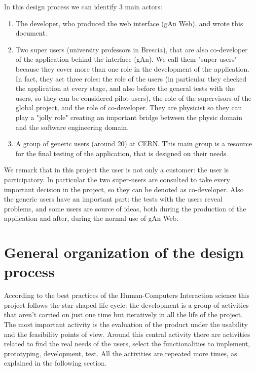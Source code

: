 In this design process we can identify 3 main actors: 
\begin{enumerate}

\item
The developer, who produced the web interface (gAn Web), and wrote this document.

\item 
Two super users (university professors in Brescia), that are also co-developer of the application behind the interface (gAn). We call them "super-users" because they cover more than one role in the development of the application. In fact, they act three roles: the role of the users (in particular they checked the application at every stage, and also before the general tests with the users, so they can be considered pilot-users), the role of the supervisors of the global project, and the role of co-developer.
They are physicist so they can play a "jolly role" creating an important bridge between the physic domain and the software engineering domain. 

\item A group of generic users (around 20) at CERN. This main group is a resource for the final testing of the application, that is designed on their needs.
 
\end{enumerate}

We remark that in this project the user is not only a customer: the user is participatory. In particular the two super-users are consulted to take every important decision in the project, so they can be denoted as co-developer. Also the generic users have an important part: the tests with the users reveal problems, and some users are source of ideas, both during the production of the application and after, during the normal use of gAn Web.

\section{General organization of the design process }
According to the best practices of the Human-Computers Interaction science this project follows the star-shaped life cycle: the development is a group of activities that aren't carried on just one time but iteratively in all the life of the project. The most important activity is the evaluation of the product under the usability and the feasibility points of view. Around this central activity there are activities related to find the real needs of the users, select the functionalities to implement, prototyping, development, test. All the activities are repeated more times, as explained in the following section.    

